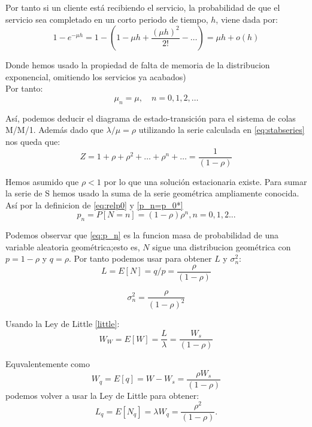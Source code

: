 \documentclass[a4paper,10pt]{scrartcl}
\theoremstyle{definition}
\numberwithin{equation}{section}
\begin{document}
	Por tanto si un cliente está recibiendo el servicio, la probabilidad de que el servicio sea completado en un corto periodo de tiempo, $h$, viene dada por:
	\begin{equation*}
	1-e^{-\mu h} = 1 - \left(1-\mu h+\frac{(\mu h)^2}{2!}- \dots\right)=\mu h +o(h)
	\end{equation*}
	
	Donde hemos usado la propiedad de falta de memoria de la distribucion exponencial, omitiendo los servicios ya acabados)\\
	Por tanto:
	\begin{equation*}
	\mu_n=\mu, \quad n=0,1,2,\dots
	\end{equation*}
	
	Así, podemos deducir el diagrama de estado-transición para el sistema de colas M/M/1. Además dado que $\lambda/\mu=\rho$ utilizando la serie calculada en \ref{eq:stabseries} nos queda que:
	\begin{equation*}
	Z=1+\rho+\rho^2+\dots+\rho^n+\dots=\frac{1}{(1-\rho)}
	\end{equation*}
	
	Hemos asumido que $\rho<1$ por lo que una solución estacionaria existe.
	Para sumar la serie de S hemos usado la suma de la serie geométrica ampliamente conocida.
	Así por la definicion de \ref{eq:relp0} y \ref{p_n=p_0*}
	\begin{equation}
	p_n=P[N=n]=(1-\rho)\rho^n, n=0,1,2...
	\label{eq:p_n}
	\end{equation}
	
	Podemos observar que \ref{eq:p_n} es la funcion masa de probabilidad de una variable aleatoria geométrica;esto
	es, $N$ sigue una distribucion geométrica con $p=1-\rho$ y $q=\rho$. Por tanto podemos usar para obtener $L$ 
	y $\sigma_n^2$:
	\begin{equation*}
	L=E[N]=q/p=\frac{\rho}{(1-\rho)}
	\end{equation*}
	
	\begin{equation*}
	\sigma_n^2=\frac{\rho}{(1-\rho)^2}
	\end{equation*}
	
	Usando la Ley de Little \ref{little}:
	\begin{equation*}
	W_W=E[W]=\frac{L}{\lambda}=\frac{W_s}{(1-\rho)}
	\end{equation*}
	
	Equvalentemente como \[ W_q=E[q]=W-W_s=\frac{\rho W_s}{(1-\rho)} \] podemos volver a usar la Ley de Little 
	para obtener:
	\begin{equation*}
	L_q=E[N_q]=\lambda W_q=\frac{\rho^2}{(1-\rho)}.
	\end{equation*}
	
\end{document}
